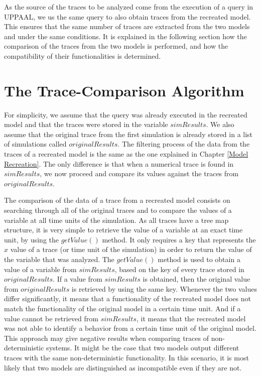 As the source of the traces to be analyzed come from the execution of a query in UPPAAL,
%
%
we us the same query to also obtain traces from the recreated model. 
%
This ensures that the same number of traces are extracted from the two models and under the same conditions. 
%
It is explained in the following section how the comparison of the traces from the two models is performed, and how the compatibility of their functionalities is determined. 

\section{The Trace-Comparison Algorithm}
For simplicity, we assume that the query was already executed in the recreated model and that the traces were stored in the variable $simResults$. 
%
We also assume that the original trace from the first simulation is already stored in a list of simulations called $originalResults$. 
%
The filtering process of the data from the traces of a recreated model is the same as the one explained in Chapter \ref{Model Recreation}. 
%
The only difference is that when a numerical trace is found in $simResults$, we now proceed and compare its values against the traces from  $originalResults$.



The comparison of the data of a trace from a recreated model consists on searching through all of the original traces and to compare the values of a variable at all time units of the simulation. 
%
As all traces have a tree map structure, it is very simple to retrieve the value of a variable at an exact time unit, by using the $getValue()$ method. 
%
It only requires a key that represents the $x$ value of a trace (or time unit of the simulation) in order to return the value of the variable that was analyzed.
%
The $getValue()$ method is used to obtain a value of a variable from $simResults$, based on the key of every trace stored in $originalResults$.
%
If a value from $simResults$ is obtained, then the original value from $originalResults$ is retrieved by using the same key.
%
Whenever the two values differ significantly, it means that a functionality of the recreated model does not match the functionality of the original model in a certain time unit.  
%
And if a value cannot be retrieved from $simResults$, it means that the recreated model was not able to identify a behavior from a certain time unit of the original model.  
%
%
This approach may give negative results when comparing traces of non-deterministic systems. 
%
It might be the case that two models output different traces with the same non-deterministic functionality. 
%
In this scenario, it is most likely that two models are distinguished as incompatible even if they are not. 
%

